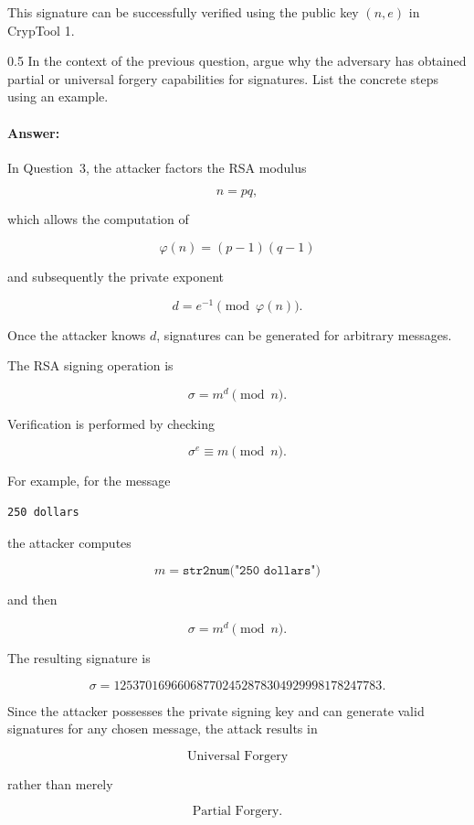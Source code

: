 \documentclass[]{scrartcl}
\newcounter{exercise}
\newcounter{qid}[section]
\newcommand{\exerciseprefix}{prefix}
\newcommand{\questiontitle}{Questions}
\newcommand{\blockid}{B4}
\newcommand{\exname}{}
\begin{document}
This signature can be successfully verified using the public key
\((n,e)\) in CrypTool 1.



\renewcommand{\exerciseprefix}{PS-\blockid{}-E\theexercise: \exname{}-Q\theqid}
\renewcommand{\questiontitle}{\exerciseprefix{}: Theoretical aspects on RSA signature attack}
\begin{exercisebox}{0.5}
In the context of the previous question, argue why the adversary has obtained partial or universal forgery capabilities for signatures. List the concrete steps using an example. 
\end{exercisebox}
\paragraph{Answer:} {

In Question~3, the attacker factors the RSA modulus

\[
n = pq,
\]

which allows the computation of

\[
\varphi(n)
=
(p-1)(q-1)
\]

and subsequently the private exponent

\[
d
=
e^{-1}
\pmod{\varphi(n)}.
\]

Once the attacker knows $d$, signatures can be generated for arbitrary messages.

The RSA signing operation is

\[
\sigma
=
m^d
\pmod n.
\]

Verification is performed by checking

\[
\sigma^e
\equiv
m
\pmod n.
\]

For example, for the message

\begin{verbatim}
250 dollars
\end{verbatim}

the attacker computes

\[
m = \texttt{str2num("250 dollars")}
\]

and then

\[
\sigma = m^d \pmod n.
\]

The resulting signature is

\[
\sigma
=
125370169660687702452878304929998178247783.
\]

Since the attacker possesses the private signing key and can generate valid signatures for any chosen message, the attack results in

\[
\boxed{\text{Universal Forgery}}
\]

rather than merely

\[
\boxed{\text{Partial Forgery}}.
\]}
\end{document}
